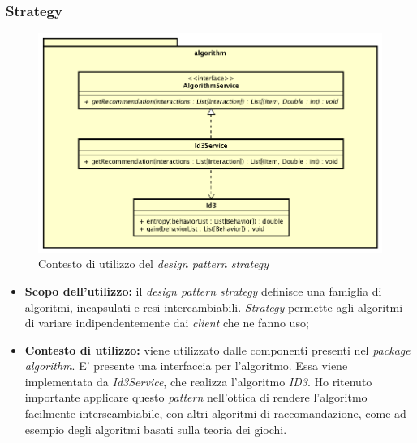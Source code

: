\subsubsection{Strategy}
\begin{figure}[h]
\centering
\includegraphics[scale=0.30]{immagini/algorithm}
\caption{Contesto di utilizzo del \emph{design pattern strategy}}
\label{fig:pattern-strategy}
\end{figure}
\begin{itemize}
\item\textbf{Scopo dell'utilizzo:} il \emph{design pattern strategy} definisce una famiglia di algoritmi, incapsulati e resi intercambiabili. \emph{Strategy} permette agli algoritmi di variare indipendentemente dai \emph{client} che ne fanno uso;
\item \textbf{Contesto di utilizzo:} viene utilizzato dalle componenti presenti nel \emph{package algorithm}. E' presente una interfaccia per l'algoritmo. Essa viene implementata da \emph{Id3Service}, che realizza l'algoritmo \emph{ID3}. Ho ritenuto importante applicare questo \emph{pattern} nell'ottica di rendere l'algoritmo facilmente interscambiabile, con altri algoritmi di raccomandazione, come ad esempio degli algoritmi basati sulla teoria dei giochi.
\end{itemize}
\newpage
